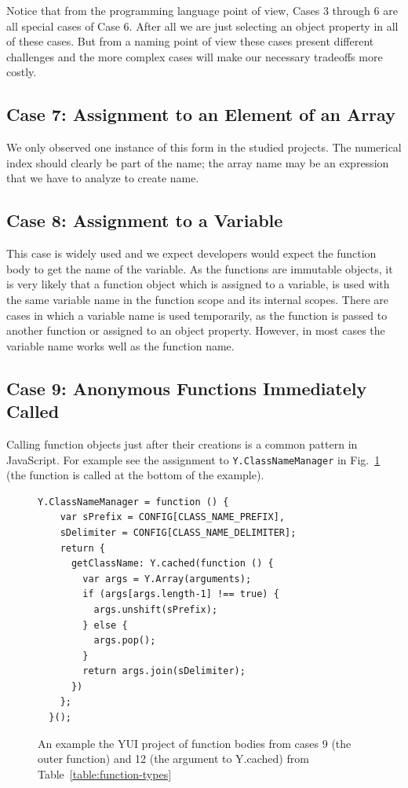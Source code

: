 \documentclass[10pt, preprint]{sigplanconf}
\begin{document}
Notice that from the programming language point of view, Cases 3 through 6 are all special cases of Case 6. After all we are just selecting an object property in all of these cases.  But from a naming point of view these cases present different challenges and the more complex cases will make our necessary tradeoffs more costly.

\subsection{Case 7: Assignment to an Element of an Array}
We only observed one instance of this form in the studied projects. The numerical index should clearly be part of the name; the array name may be an expression that we have to analyze to create name.

\subsection{Case 8: Assignment to a Variable }
This case is widely used and we expect  developers would expect the function body to get the name of the variable.
As the functions are immutable objects, it is very likely that a function object which is assigned to a variable, is used with the same variable name in the function scope
and its internal scopes. There are cases in which a variable name is used temporarily, as the function is passed to another function or assigned to an object property. However, in most cases the variable name works well as the function name. 

\subsection{Case 9: Anonymous Functions Immediately Called}
Calling function objects just after their creations is a common pattern in JavaScript. For example see the assignment to \verb|Y.ClassNameManager| in Fig.~\ref{fig:classnamemanager} (the function is called at the bottom of the example). 
\begin{figure}[htp]
\lstset{basicstyle=\scriptsize}
\begin{lstlisting}[frame=single, language=myLang]
  Y.ClassNameManager = function () {
    var sPrefix = CONFIG[CLASS_NAME_PREFIX],
    sDelimiter = CONFIG[CLASS_NAME_DELIMITER];
    return {
      getClassName: Y.cached(function () {
        var args = Y.Array(arguments);
        if (args[args.length-1] !== true) {
          args.unshift(sPrefix);
        } else {
          args.pop();
        }
        return args.join(sDelimiter);
      })
    };
  }();
\end{lstlisting}
\caption{An example the YUI project of function bodies from cases 9 (the outer function)  and 12  (the argument to Y.cached) from Table~\ref{table:function-types}  }
\label{fig:classnamemanager}
\end{figure}
\end{document}
